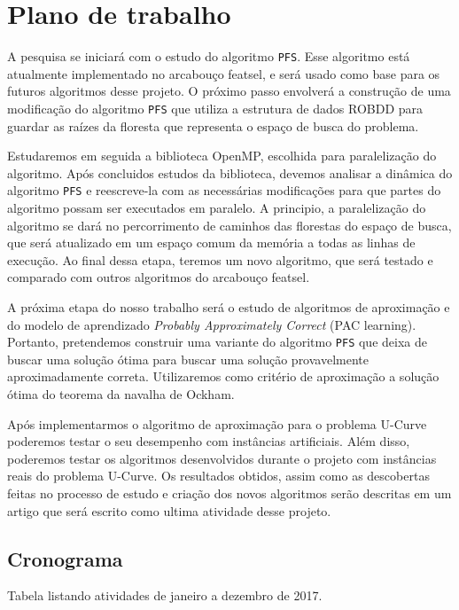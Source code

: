 \documentclass[12pt]{article}
\begin{document}
\section{Plano de trabalho}
A pesquisa se iniciará com o estudo do algoritmo {\tt PFS}. Esse 
algoritmo está atualmente implementado no arcabouço featsel, e será 
usado como base para os futuros algoritmos desse projeto. O próximo 
passo envolverá a construção de uma modificação do algoritmo {\tt PFS}
que utiliza a estrutura de dados ROBDD para guardar as raízes da 
floresta que representa o espaço de busca do problema.

Estudaremos em seguida a biblioteca OpenMP, escolhida para paralelização
do algoritmo. Após concluidos estudos da biblioteca, devemos analisar a
dinâmica do algoritmo {\tt PFS} e reescreve-la com as necessárias 
modificações para que partes do algoritmo possam ser executados em
paralelo. A principio, a paralelização do algoritmo se dará no 
percorrimento de caminhos das florestas do espaço de busca, que será 
atualizado em um espaço comum da memória a todas as linhas de execução.
Ao final dessa etapa, teremos um novo algoritmo, que será testado
e comparado com outros algoritmos do arcabouço featsel.

A próxima etapa do nosso trabalho será o estudo de algoritmos de 
aproximação e do modelo de aprendizado \textit{Probably Approximately
Correct} (PAC learning). Portanto, pretendemos construir uma variante do
algoritmo {\tt PFS} que deixa de buscar uma solução ótima para buscar
uma solução provavelmente aproximadamente correta. Utilizaremos como 
critério de aproximação a solução ótima do teorema da navalha de Ockham.

Após implementarmos o algoritmo de aproximação para o problema U-Curve
poderemos testar o seu desempenho com instâncias artificiais. Além 
disso, poderemos testar os algoritmos desenvolvidos durante o projeto
com instâncias reais do problema U-Curve. Os resultados obtidos, assim
como as descobertas feitas no processo de estudo e criação dos novos
algoritmos serão descritas em um artigo que será escrito como ultima 
atividade desse projeto.

\subsection{Cronograma}
Tabela listando atividades de janeiro a dezembro de 2017.
\end{document}
